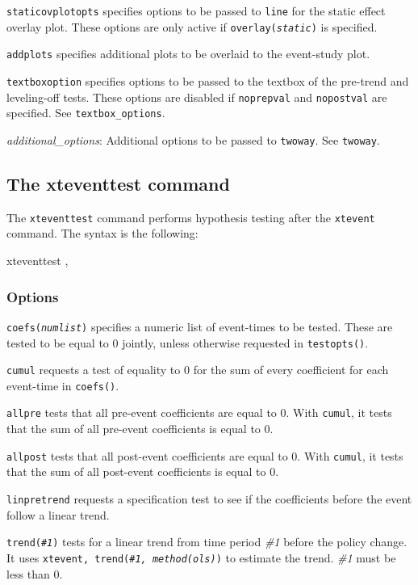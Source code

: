 \documentclass[bib]{./sty/statapress}
\begin{document}
\hangpara
\texttt{staticovplotopts} specifies options to be passed to \texttt{line} for the static effect overlay plot.
These options are only active if \texttt{overlay({\it static})} is specified.

\hangpara
\texttt{addplots} specifies additional plots to be overlaid to the event-study plot.

\hangpara
\texttt{textboxoption} specifies options to be passed to the textbox of the pre-trend and leveling-off tests.
These options are disabled if \texttt{noprepval} and \texttt{nopostval} are specified.
See \texttt{textbox\_options}.

\hangpara
{\it additional\_options}: Additional options to be passed to \texttt{twoway}.
See \texttt{twoway}.

\subsection{The xteventtest command}
The \texttt{xteventtest} command performs hypothesis testing after the \texttt{xtevent} command. The syntax is the following:

\begin{stsyntax}
xteventtest ,
\end{stsyntax}

\subsubsection{Options}
\hangpara
\texttt{coefs({\it numlist})} specifies a numeric list of event-times to be tested. These are tested to be equal to $0$ jointly, unless otherwise requested in \texttt{testopts()}.

\hangpara
\texttt{cumul} requests a test of equality to $0$ for the sum of every coefficient for each event-time in \texttt{coefs()}.

\hangpara
\texttt{allpre} tests that all pre-event coefficients are equal to $0$. With \texttt{cumul}, it tests that the sum of all pre-event coefficients is equal to $0$.

\hangpara
\texttt{allpost} tests that all post-event coefficients are equal to $0$. With \texttt{cumul}, it tests that the sum of all post-event coefficients is equal to $0$.

\hangpara
\texttt{linpretrend} requests a specification test to see if the coefficients before the event follow a linear trend.

\hangpara
\texttt{trend({\it \#1})} tests for a linear trend from time period {\it \#1} before the policy change. It uses \texttt{xtevent, trend({\it \#1, method(ols)})} to estimate the trend. {\it \#1} must be less than $0$.
\end{document}
